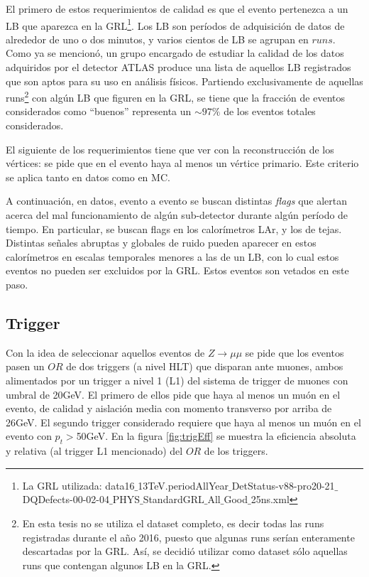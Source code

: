 El primero de estos requerimientos de calidad es que el evento pertenezca a un LB que aparezca en la GRL\footnote{La GRL utilizada: data16$\_$13TeV.periodAllYear$\_$DetStatus-v88-pro20-21$\_$DQDefects-00-02-04$\_$PHYS$\_$StandardGRL$\_$All$\_$Good$\_$25ns.xml}.
Los LB son períodos de adquisición de datos de alrededor de uno o dos minutos, y varios cientos de LB se agrupan en $runs$.
Como ya se mencionó, un grupo encargado de estudiar la calidad de los datos adquiridos por el detector ATLAS produce una lista de aquellos LB registrados que son aptos para su uso en análisis físicos. Partiendo exclusivamente de aquellas runs\footnote{En esta tesis no se utiliza el dataset completo, es decir todas las runs registradas durante el año 2016, puesto que algunas runs serían enteramente descartadas por la GRL. Así, se decidió utilizar como dataset sólo aquellas runs que contengan algunos LB en la GRL.} con algún LB que figuren en la GRL, se tiene que la fracción de eventos considerados como ``buenos'' representa un $\sim 97\%$ de los eventos totales considerados.

El siguiente de los requerimientos tiene que ver con la reconstrucción de los vértices: se pide que en el evento haya al menos un vértice primario. Este criterio se aplica tanto en datos como en MC.

A continuación, en datos, evento a evento se buscan distintas \textit{flags} que alertan acerca del mal funcionamiento de algún sub-detector durante algún período de tiempo. En particular, se buscan flags en los calorímetros LAr, y los de tejas. Distintas señales abruptas y globales de ruido pueden aparecer en estos calorímetros en escalas temporales menores a las de un LB, con lo cual estos eventos no pueden ser excluidos por la GRL. Estos eventos son vetados en este paso.



\subsection{Trigger}

Con la idea de seleccionar aquellos eventos de $Z\rightarrow \mu\mu$ se pide que los eventos pasen un $OR$ de dos triggers (a nivel HLT) que disparan ante muones, ambos alimentados por un trigger a nivel 1 (L1) del sistema de trigger de muones con umbral de 20GeV. El primero de ellos pide que haya al menos un muón en el evento, de calidad y aislación media con momento transverso por arriba de 26GeV. El segundo trigger considerado requiere que haya al menos un muón en el evento con $p_t>$50GeV.  
En la figura \ref{fig:trigEff} se muestra la eficiencia absoluta y relativa (al trigger L1 mencionado) del $OR$ de los triggers. 

